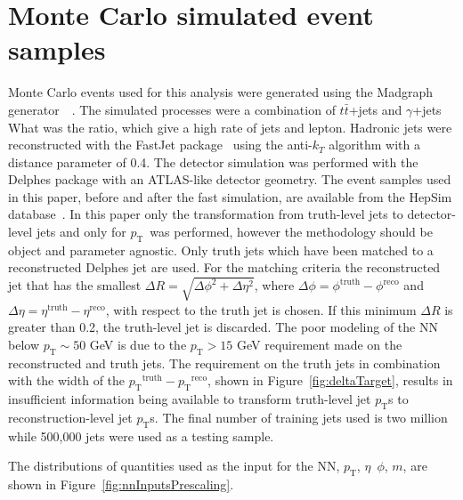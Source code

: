 \documentclass[showpacs,showkeys,preprint,prd,nofootinbib,linenumbers,12pt]{revtex4-1}
\def\pt{\ensuremath{p_{\mathrm{T}}}}
\def\ptRes{\ensuremath{\pt^{\mathrm{truth}}-\pt^{\mathrm{reco}}}}
\begin{document}
\section{Monte Carlo simulated event samples}

Monte Carlo events used for this analysis were generated using the Madgraph generator~~\cite{Alwall:2014hca}. The simulated processes were a combination of $t\bar{t}$+jets and $\gamma$+jets {\color{red} What was the ratio}, which give a high rate of jets and lepton. 
Hadronic jets were reconstructed with the {\sc FastJet} package~\cite{Fastjet} using the anti-$k_T$ algorithm \cite{Cacciari:2008gp} with a distance parameter of 0.4. The detector simulation was performed with the Delphes package \cite{deFavereau:2013fsa} with an ATLAS-like detector geometry. 
The event samples used in this paper, before and after the fast simulation, are available from the HepSim database~\cite{Chekanov:2014fga}. In this paper only the transformation from truth-level jets to detector-level jets and only for \pt\ was performed, however the methodology should be object and parameter agnostic. Only truth jets which have been matched to a reconstructed Delphes jet are used. For the matching criteria the reconstructed jet that has the smallest $\Delta R=\sqrt{\Delta\phi^2+\Delta\eta^2}$, where $\Delta\phi=\phi^{\text{truth}}-\phi^{\text{reco}}$ and $\Delta\eta=\eta^{\text{truth}}-\eta^{\text{reco}}$, with respect to the truth jet is chosen. If this minimum $\Delta R$ is greater than 0.2, the truth-level jet is discarded.
The poor modeling of the NN below $\pt\sim 50$ GeV is due to the $\pt>15$ GeV requirement made on the reconstructed and truth jets. The requirement on the truth jets in combination with the width of the \ptRes, shown in Figure~\ref{fig:deltaTarget}, results in insufficient information being available to transform truth-level jet \pt s to reconstruction-level jet \pt s.
The final number of training jets used is two million while 500,000 jets were used as a testing sample.  

The distributions of quantities used as the input for the NN, \pt, $\eta$\, $\phi$, $m$, are shown in Figure~\ref{fig:nnInputsPrescaling}.
\end{document}
